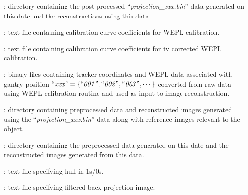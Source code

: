 \documentclass[landscape,12pt]{article}
\begin{document}
\begin{myEnumerate}[labelindent=1pt, leftmargin=*]
\begin{myEnumerate}[labelindent=1pt, leftmargin=*]
\begin{myEnumerate}[labelindent=1pt, leftmargin=*]
\begin{myEnumerate}[labelindent=1pt, leftmargin=*]
\begin{myEnumerate}[labelindent=1pt, leftmargin=*]
                        \begin{myEnumerate}[labelindent=1pt, leftmargin=*]
                            \item {} \color{Black}: directory containing the post processed ``\textit{projection\_xxx.bin}'' data generated on this date and the reconstructions using this data.
                            \begin{myEnumerate}[labelindent=1pt, leftmargin=*]
                                \item {} \color{Black}: text file containing calibration curve coefficients for WEPL calibration.
                                \item {} \color{Black}: text file containing calibration curve coefficients for tv corrected WEPL calibration.
                                \item {} \color{Black}: binary files containing tracker coordinates and WEPL data associated with gantry position $\textrm{``\textit{xxx}''} =\{\textrm{``\textit{001}''}, \textrm{``\textit{002}''}, \textrm{``\textit{003}''}, \cdots\}$ converted from raw data using WEPL calibration routine and used as input to image reconstruction.
                                \item {} \color{Black}: directory containing preprocessed data and reconstructed images generated using the ``\textit{projection\_xxx.bin}'' data along with reference images relevant to the object.
                                \begin{myEnumerate}[labelindent=1pt, leftmargin=*]
                                    \item {} \color{Black}: directory containing the preprocessed data generated on this date and the reconstructed images generated from this data.
                                    \begin{myEnumerate}[labelindent=1pt, leftmargin=*]
                                        \item {} \color{Black}: text file specifying hull in 1s/0s.
                                        \item {} \color{Black}: text file specifying filtered back projection image.

\end{myEnumerate}
\end{myEnumerate}
\end{myEnumerate}
\end{myEnumerate}
\end{myEnumerate}
\end{myEnumerate}
\end{myEnumerate}
\end{myEnumerate}
\end{myEnumerate}
\end{document}
